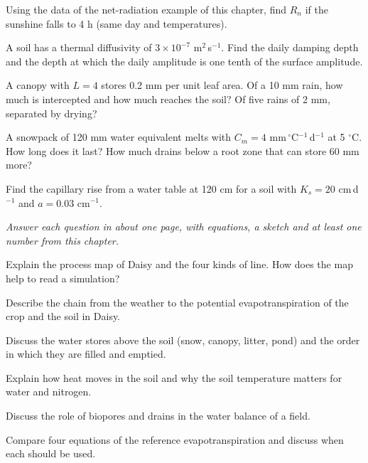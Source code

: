 \begin{exlist}
\item Using the data of the net-radiation example of this chapter, find $R_n$ if the sunshine falls to 4 h (same day and temperatures).
\item A soil has a thermal diffusivity of $3\times10^{-7}$ m$^2$\,s$^{-1}$. Find the daily damping depth and the depth at which the daily amplitude is one tenth of the surface amplitude.
\item A canopy with $L=4$ stores 0.2 mm per unit leaf area. Of a 10 mm rain, how much is intercepted and how much reaches the soil? Of five rains of 2 mm, separated by drying?
\item A snowpack of 120 mm water equivalent melts with $C_m=4$ mm\,$^\circ$C$^{-1}$\,d$^{-1}$ at 5 $^\circ$C. How long does it last? How much drains below a root zone that can store 60 mm more?
\item Find the capillary rise from a water table at 120 cm for a soil with $K_s=20$ cm\,d$^{-1}$ and $a=0.03$ cm$^{-1}$.
\end{exlist}
{\small\itshape Answer each question in about one page, with equations, a sketch and at least one number from this chapter.}\par\vspace{3pt}
\begin{exlist}
\item Explain the process map of Daisy and the four kinds of line. How does the map help to read a simulation?
\item Describe the chain from the weather to the potential evapotranspiration of the crop and the soil in Daisy.
\item Discuss the water stores above the soil (snow, canopy, litter, pond) and the order in which they are filled and emptied.
\item Explain how heat moves in the soil and why the soil temperature matters for water and nitrogen.
\item Discuss the role of biopores and drains in the water balance of a field.
\item Compare four equations of the reference evapotranspiration and discuss when each should be used.
\end{exlist}
